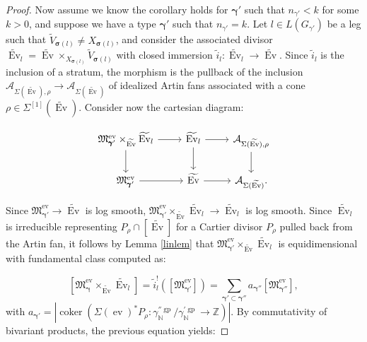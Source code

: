 \documentclass[12pt, oneside]{amsart}   	%
\newcommand{\NN}{\mathbb{N}}
\newcommand{\ZZ}{\mathbb{Z}}
\newcommand{\ev}{\operatorname{ev}}
\newcommand{\Ev}{\operatorname{Ev}}
\newcommand{\gp}{\operatorname{gp}}
\newcommand{\coker}{\operatorname{coker}}
\numberwithin{equation}{section}
\numberwithin{thm}{section}
\numberwithin{figure}{section}
\begin{document}
\begin{proof}
Now assume we know the corollary holds for $\pmb\gamma'$ such that $n_{\gamma'} <k$ for some $k > 0$, and suppose we have a type $\pmb\gamma'$ such that $n_{\gamma'} = k$. Let $l \in L(G_{\gamma'})$ be a leg such that $\widetilde{V}_{\pmb\sigma(l)} \not= X_{\pmb\sigma(l)}$, and consider the associated divisor $\widetilde{\Ev}_l = \widetilde{\Ev} \times_{X_{\pmb\sigma(l)}} \widetilde{V}_{\pmb\sigma(l)}$ with closed immersion $\tilde{i}_l: \widetilde{\Ev}_l \rightarrow \widetilde{\Ev}$. Since $\tilde{i}_l$ is the inclusion of a stratum, the morphism is the pullback of the inclusion $\mathcal{A}_{\Sigma(\widetilde{\Ev}),\rho} \rightarrow \mathcal{A}_{\Sigma(\widetilde{\Ev})}$ of idealized Artin fans associated with a cone $\rho \in \Sigma^{[1]}(\widetilde{\Ev})$. Consider now the cartesian diagram:

\begin{equation}
\begin{tikzcd}
\mathfrak{M}^{\ev}_{\pmb\gamma'}\times_{\widetilde{\Ev}} \widetilde{\Ev}_{l} \arrow{r}\arrow{d} & \widetilde{\Ev}_{l} \arrow{d}\arrow{r}& \mathcal{A}_{\Sigma(\widetilde{\Ev}),\rho}\arrow{d}\\
\mathfrak{M}^{\ev}_{\pmb\gamma'} \arrow{r} & \widetilde{\Ev} \arrow{r} & \mathcal{A}_{\Sigma(\widetilde{\Ev})}.
\end{tikzcd}
\end{equation}


Since $\mathfrak{M}^{\ev}_{\pmb\gamma'} \rightarrow \widetilde{\Ev}$ is log smooth, $\mathfrak{M}^{\ev}_{\pmb\gamma'}\times_{\widetilde{\Ev}} \widetilde{\Ev}_{l}  \rightarrow \widetilde{\Ev}_{l}$ is log smooth. Since $\widetilde{\Ev}_{l}$ is irreducible representing $P_\rho \cap [\widetilde{\Ev}]$ for a Cartier divisor $P_\rho$ pulled back from the Artin fan, it follows by Lemma \ref{linlem} that $\mathfrak{M}^{\ev}_{\pmb\gamma'}\times_{\widetilde{\Ev}} \widetilde{\Ev}_{l}$ is equidimensional with fundamental class computed as:

$$[\mathfrak{M}^{\ev}_{\pmb\gamma}\times_{\widetilde{\Ev}} \widetilde{\Ev}_{l}] = \tilde{i}_l^!([\mathfrak{M}^{\ev}_{\pmb\gamma'}]) = \sum_{\pmb\gamma' \subset \pmb\gamma''} a_{\pmb\gamma''}[\mathfrak{M}^{\ev}_{\pmb\gamma''}],$$
with $a_{\pmb\gamma'} = |\coker(\Sigma(\ev)^*P_\rho: \gamma^{''\gp}_{\NN}/\gamma^{'\gp}_{\NN} \rightarrow \ZZ)|$. By commutativity of bivariant products, the previous equation yields:


\end{proof}
\end{document}
